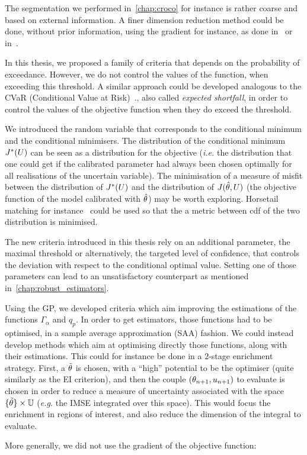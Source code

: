 \documentclass[../../Main_ManuscritThese.tex]{subfiles}
\begin{document}
The segmentation we performed in~\cref{chap:croco} for instance is
rather coarse and based on external information. A finer dimension
reduction method could be done, without prior information, using the
gradient for instance, as done in~\cite{benameur_refinement_2002} or
in~\cite{zahm_certified_2018}.



In this thesis, we proposed a family of criteria that depends on the
probability of exceedance. However, we do not control the values of
the function, when exceeding this threshold. A similar approach could
be developed analogous to the CVaR (Conditional Value at
Risk)~\cite{rockafellar_conditional_2002}., also called \emph{expected
  shortfall}, in order to control the values of the objective function
when they do exceed the threshold.

We introduced the random variable that corresponds to the conditional
minimum and the conditional minimisers. The distribution of the
conditional minimum $J^*(U)$ can be seen as a distribution for the
objective (\emph{i.e.} the distribution that one could get if the
calibrated parameter had always been chosen optimally for all
realisations of the uncertain variable). The minimisation of a measure
of misfit between the distribution of $J^*(U)$ and the distribution
of $J(\hat{\theta},U)$ (the objective function of the model calibrated
with $\hat{\theta}$) may be worth exploring. Horsetail matching for
instance~\cite{cook_extending_2017,cook_horsetail_2018} could be
used so that the a metric between cdf of the two distribution is minimised.

The new criteria introduced in this thesis rely on an additional
parameter, the maximal threshold or alternatively, the targeted level
of confidence, that controls the deviation with respect to the
conditional optimal value. Setting one of those parameters can lead to
an unsatisfactory counterpart as mentioned
in~\cref{chap:robust_estimators}.




Using the GP, we developed criteria which aim improving the
estimations of the functions $\Gamma_\alpha$ and $q_p$. In order to
get estimators, those functions had to be optimised, in a sample
average approximation (SAA) fashion. We could instead develop methods
which aim at optimising directly those functions, along with their
estimations. This could for instance be done in a $2$-stage enrichment
strategy. First, a $\tilde{\theta}$ is chosen, with a ``high'' potential to be
the optimiser (quite similarly as the EI criterion), and then the
couple $(\theta_{n+1}, u_{n+1})$ to evaluate is chosen in order to
reduce a measure of uncertainty associated with the space
$\{\tilde{\theta}\} \times \mathbb{U}$ (\emph{e.g.} the IMSE integrated over this
space). This would focus the enrichment in regions of interest, and
also reduce the dimension of the integral to evaluate.

More generally, we did not use the gradient of the objective function:






\etoile
\vfill

\subfileLocal{
	\pagestyle{empty}
	
        
}

\end{document}
